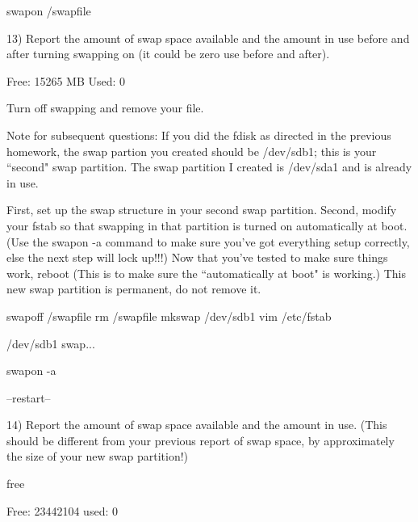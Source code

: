 swapon /swapfile


13) Report the amount of swap space available and the 
amount in use before and after turning swapping on 
(it could be zero use before and after).

Free: 15265 MB
Used: 0

Turn off swapping and remove your file.

Note for subsequent questions:
If you did the {\ltt{}fdisk} as directed in the previous 
homework, the swap partion you created should be 
{\ltt{}/dev/sdb1}; this is your ``second" swap partition.
The swap partition I created is {\ltt{}/dev/sda1} 
and is already in use.

First, set up the swap structure in your second swap partition.
Second, modify your {\ltt{}fstab} so that swapping in 
that partition is turned on automatically at boot.
(Use the {\ltt{}swapon -a} command to make sure you've got
everything setup correctly, else the next step will lock up!!!)
Now that you've tested to make sure things work, reboot
(This is to make sure the ``automatically at boot" is working.)
This new swap partition is permanent, do not remove it.

swapoff /swapfile
rm /swapfile
mkswap /dev/sdb1
vim /etc/fstab

/dev/sdb1 swap...

swapon -a

--restart--


14) Report the amount of swap space available and the amount in use.
(This should be different from your previous report of 
swap space, by approximately the size of your new 
swap partition!)

free

Free: 23442104
used: 0

\bye

